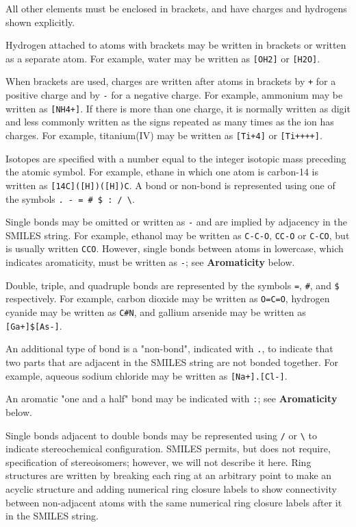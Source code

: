 \documentclass[a4paper,12pt]{report}
\begin{document}
All other elements must be enclosed in brackets, and have charges and hydrogens shown explicitly.

Hydrogen attached to atoms with brackets may be written in brackets or written as a separate atom. For example, water may be written as \texttt{[OH2]} or \texttt{[H2O]}.

When brackets are used, charges are written after atoms in brackets by \texttt{+} for a positive charge and by \texttt{-} for a negative charge. For example, ammonium may be written as \texttt{[NH4+]}. If there is more than one charge, it is normally written as digit and less commonly written as the signs repeated as many times as the ion has charges. For example, titanium(IV) may be written as \texttt{[Ti+4]} or \texttt{[Ti++++]}.

Isotopes are specified with a number equal to the integer isotopic mass preceding the atomic symbol. For example, ethane in which one atom is carbon-14 is written as \texttt{[14C]([H])([H])C}.
A bond or non-bond is represented using one of the symbols \texttt{. - = \# \$ : / \textbackslash}.
\ben
\item Single bonds may be omitted or written as \texttt{-} and are implied by adjacency in the SMILES string. For example, ethanol may be written as \texttt{C-C-O}, \texttt{CC-O} or \texttt{C-CO}, but is usually written \texttt{CCO}. However, single bonds between atoms in lowercase, which indicates aromaticity, must be written as \texttt{-}; see \textbf{Aromaticity} below.
\item Double, triple, and quadruple bonds are represented by the symbols \texttt{=}, \texttt{\#}, and \texttt{\$} respectively. For example, carbon dioxide may be written as \texttt{O=C=O}, hydrogen cyanide may be written as \texttt{C\#N}, and gallium arsenide may be written as \texttt{[Ga+]\$[As-]}.
\item An additional type of bond is a "non-bond", indicated with \texttt{.}, to indicate that two parts that are adjacent in the SMILES string are not bonded together. For example, aqueous sodium chloride may be written as \texttt{[Na+].[Cl-]}.
\item An aromatic "one and a half" bond may be indicated with \texttt{:}; see \textbf{Aromaticity} below.
\item Single bonds adjacent to double bonds may be represented using \texttt{/} or \texttt{\textbackslash} to indicate stereochemical configuration. SMILES permits, but does not require, specification of stereoisomers; however, we will not describe it here.
\een
{}
Ring structures are written by breaking each ring at an arbitrary point to make an acyclic structure and adding numerical ring closure labels to show connectivity between non-adjacent atoms with the same numerical ring closure labels after it in the SMILES string.
\end{document}
